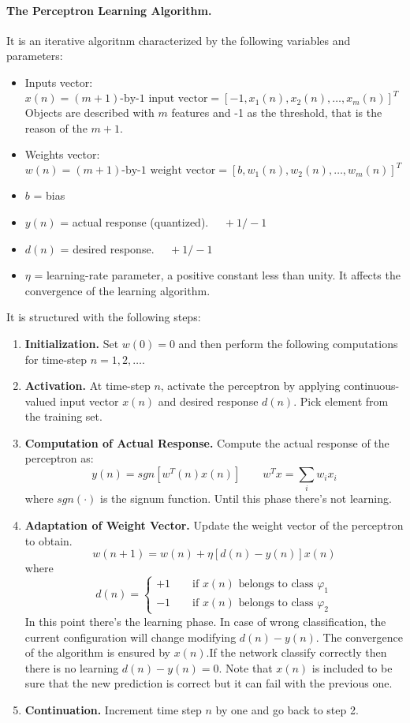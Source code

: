 \paragraph*{The Perceptron Learning Algorithm.} It is an iterative algoritnm characterized by the following variables and parameters:
\begin{itemize}
	\item Inputs vector: $x(n) = (m+1)\text{-by-1 input vector} = [-1, x_1(n), x_2(n), \dots, x_m(n)]^T$\\
	Objects are described with $m$ features and -1 as the  threshold, that is the reason of the $m+1$.
	\item Weights vector: $w(n) = (m+1)\text{-by-1 weight vector} = [b, w_1(n), w_2(n), \dots, w_m(n)]^T$
	\item $b$ = bias
	\item $y(n)$ = actual response (quantized). $\quad +1/-1$
	\item $d(n)$ = desired response. $\quad +1/-1$
	\item $\eta$ = learning-rate parameter, a positive constant less than unity. It affects the convergence of the learning algorithm. 
\end{itemize}
It is structured with the following steps:
\begin{enumerate}
	\item \textbf{Initialization.} Set $w(0) = 0$ and then perform the following computations for time-step $n=1,2,\dots$.
	\item \textbf{Activation.} At time-step $n$, activate the perceptron by applying continuous-valued input vector $x(n)$ and desired response $d(n)$. Pick element from the training set.
	\item \textbf{Computation of Actual Response.} Compute the actual response of the perceptron as:
	$$y(n) = sgn[w^T(n)x(n)] \qquad w^Tx = \sum_iw_ix_i$$
	where $sgn(\cdot)$ is the signum function. Until this phase there's not learning.
	\item \textbf{Adaptation of Weight Vector.} Update the weight vector of the perceptron to obtain.
	$$w(n+1) = w(n) + \eta[d(n) - y(n)]x(n)$$
	where
	$$d(n) = 
	\begin{cases}
	+1 \qquad \text{if } x(n) \text{ belongs to class } \varphi_1\\
	-1 \qquad \text{if } x(n) \text{ belongs to class } \varphi_2 
	\end{cases}$$
	In this point there's the learning phase. In case of wrong classification, the current configuration will change modifying $d(n) - y(n)$. The convergence of the algorithm is ensured by $x(n)$.If the network classify correctly then there is no learning $d(n)-y(n) = 0$. Note that $x(n)$ is included to be sure that the new prediction is correct but it can fail with the previous one.
	\item \textbf{Continuation.} Increment time step $n$ by one and go back to step 2.
\end{enumerate}
